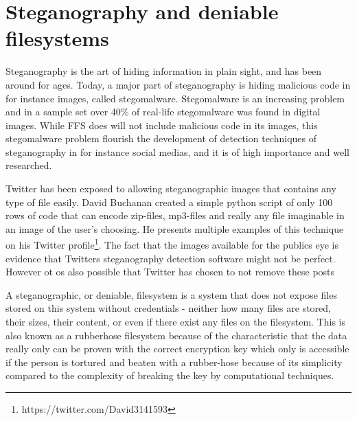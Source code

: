 \section{Steganography and deniable filesystems}
Steganography is the art of hiding information in plain sight, and has been around for ages. Today, a major part of steganography is hiding malicious code in for instance images, called stegomalware. Stegomalware is an increasing problem and in a sample set over 40\% of real-life stegomalware was found in digital images\cite{SIMARGLStegwarePrimer}. While FFS does will not include malicious code in its images, this stegomalware problem flourish the development of detection techniques of steganography in for instance social medias, and it is of high importance and well researched. 

Twitter has been exposed to allowing steganographic images that contains any type of file easily\cite{TwitterImagesCan}. David Buchanan created a simple python script of only 100 rows of code that can encode zip-files, mp3-files and really any file imaginable in an image of the user's choosing\cite{buchananTweetablepolyglotpng2022}. He presents multiple examples of this technique on his Twitter profile\footnote{https://twitter.com/David3141593}. The fact that the images available for the publics eye is evidence that Twitters steganography detection software might not be perfect. However ot os also possible that Twitter has chosen to not remove these posts

A steganographic, or deniable, filesystem is a system that does not expose files stored on this system without credentials - neither how many files are stored, their sizes, their content, or even if there exist any files on the filesystem\cite{petersDEFYDeniableFile2014}. This is also known as a rubberhose filesystem because of the characteristic that the data really only can be proven with the correct encryption key which only is accessible if the person is tortured and beaten with a rubber-hose because of its simplicity compared to the complexity of breaking the key by computational techniques.

